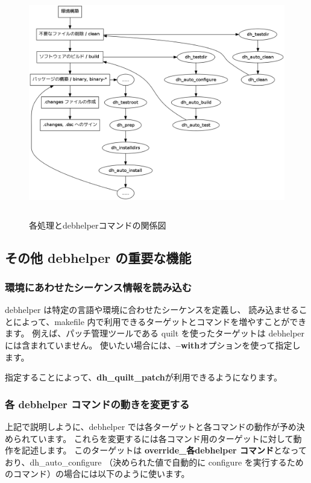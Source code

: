 \documentclass[mingoth,a4paper]{jsarticle}
\begin{document}
\begin{figure}[ht]
  \begin{center}
    \includegraphics[height=10cm]{image201110/rules-work.png}
  \end{center}
  \label{fig:rules-work}\caption{各処理とdebhelperコマンドの関係図}
\end{figure}

\subsection{その他 debhelper の重要な機能}

\subsubsection{環境にあわせたシーケンス情報を読み込む}
debhelper は特定の言語や環境に合わせたシーケンスを定義し、
読み込ませることによって、makefile 内で利用できるターゲットとコマンドを増やすことができます。
例えば、パッチ管理ツールである quilt を使ったターゲットは debhelper には含まれていません。
使いたい場合には、{\bf --with}オプションを使って指定します。

指定することによって、{\bf{dh\_quilt\_patch}}が利用できるようになります。

\subsubsection{各 debhelper コマンドの動きを変更する}
上記で説明しように、debhelper では各ターゲットと各コマンドの動作が予め決められています。
これらを変更するには各コマンド用のターゲットに対して動作を記述します。
このターゲットは {\bf override\_各debhelper コマンド}となっており、dh\_auto\_configure
（決められた値で自動的に configure を実行するためのコマンド）の場合には以下のように使います。
\end{document}
